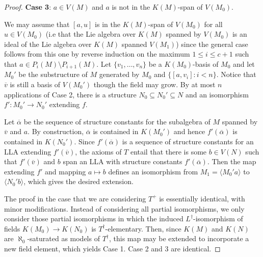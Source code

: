 \documentclass[psamsfonts]{amsart}
\theoremstyle{definition}
\theoremstyle{definition}
\theoremstyle{remark}
\numberwithin{equation}{section}
\newcommand{\set}[1]{\left\{ {#1} \right\}}
\newcommand{\red}[1]{\textcolor{red}{#1}}
\begin{document}
\begin{proof}
\textbf{Case 3}:  $a \in V(M)$ and $a$ is not in the $K(M)$-span of $V(M_{0})$.

We may assume that $[a,u]$ is in the $K(M)$-span of $V(M_{0})$ for all $u \in V(M_{0})$ (i.e that the Lie algebra over $K(M)$ spanned by $V(M_{0})$ is an ideal of the Lie algebra over $K(M)$ spanned $V(M_{1})$) since the general case follows from this one by reverse induction on the maximum $1\leq i\leq c+1$ such that $a\in P_i(M)\setminus P_{i+1}(M)$. Let $\{v_1,\dots, v_n\}$ be a $K(M_0)$-basis of $M_0$ and let $M_{0}'$ be the substructure of $M$ generated by $M_{0}$ and $\{[a,v_{i}] : i < n\}$.  Notice that $\overline{v}$ is still a basis of $V(M_{0}')$ though the field may grow. 
 By at most $n$ applications of Case 2, there is a structure $N_{0} \subseteq N_{0}' \subseteq N$ and an isomorphism $f': M_{0}' \to N_{0}'$ extending $f$.  

 Let $\overline{\alpha}$ be the sequence of structure constants for the subalgebra of $M$ spanned by $\overline{v}$ and $a$. By construction, $\overline{\alpha}$ is contained in $K(M_{0}')$ and hence $f'(\overline{\alpha})$ is contained in $K(N_{0}')$.  Since $f'(\overline{\alpha})$ is a sequence of structure constants for an LLA extending $f'(\overline{v})$, the axioms of $T$ entail that there is some $b \in V(N)$ such that $f'(\overline{v})$ and $b$ span an LLA with structure constants $f'(\overline{\alpha})$.  Then the map extending $f'$ and mapping $a \mapsto b$ defines an isomorphism from $M_{1} = \langle M_{0}'a \rangle$ to $\langle N_{0}'b \rangle$, which gives the desired extension.  

 The proof in the case that we are considering $T^{+}$ is essentially identical, with minor modifications. %
 Instead of considering all partial isomorphisms, we only consider those partial isomorphisms in which the induced $L^\dagger$-isomorphism of fields $K(M_0)\to K(N_0)$ is $T^\dagger$-elementary.  Then, since $K(M)$ and $K(N)$ are $\aleph_{0}$-saturated as models of $T^{\dagger}$, this map may be extended to incorporate a new field element, which yields Case 1. Case 2 and 3 are identical.
\end{proof}
\end{document}

